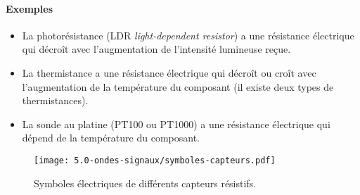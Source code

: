 \paragraph{Exemples}
\begin{itemize}
 \item La photorésistance (LDR \textit{ light-dependent resistor}) a une résistance électrique qui décroît avec l'augmentation de l'intensité lumineuse reçue.
 \item La thermistance a une résistance électrique qui décroît ou croît avec l'augmentation de la température du composant (il existe deux types de thermistances).
 \item La sonde au platine (PT100 ou PT1000) a une résistance électrique qui dépend de la température du composant. 
\end{itemize}
\begin{figure}[h!]
  \begin{center}
      \texttt{[image: 5.0-ondes-signaux/symboles-capteurs.pdf]}
  \end{center}
  \caption{Symboles électriques de différents capteurs résistifs.}
  \label{fig:symboles-capteurs}
\end{figure}



